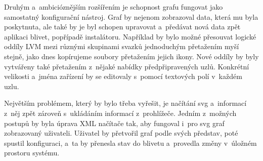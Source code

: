\documentclass[color,table,oneside,nolot,nolof]{fithesis}
\begin{document}
	Druhým a~ambicióznějším rozšířením je schopnost grafu fungovat jako samostatný konfigurační nástroj. Graf by nejenom zobrazoval data, která mu byla poskytnuta, ale také by je byl
	schopen upravovat a~předávat nová data zpět aplikaci blivet, popřípadě instalátoru. Například by bylo možné přesouvat logické oddíly LVM mezi různými skupinami svazků jednoduchým 
	přetažením myší stejně, jako dnes kopírujeme soubory přetažením jejich ikony. Nové oddíly by byly vytvářeny také přetažením z~nějaké nabídky předpřipravených uzlů. Konkrétní velikosti
	a~jména zařízení by se editovaly s~pomocí textových polí v~každém uzlu.
	
	Největším problémem, který by bylo třeba vyřešit, je načítání svg a~informací z~něj zpět zároveň s~ukládáním informací z~prohlížeče. 
	Jedním z~možných postupů by byla úprava XML načítače tak, aby fungoval i~pro svg graf zobrazovaný uživateli. Uživatel by přetvořil graf podle svých představ, poté spustil 
	konfiguraci, a~ta by přenesla stav do blivetu a~provedla změny v~úložném prostoru systému. 

	\printbibliography
\end{document}
